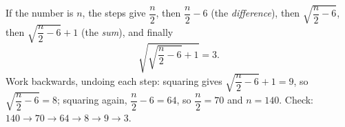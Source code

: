 If the number is $n$, the steps give $\dfrac {n}{2}$, then $\dfrac {n}{2}-6$ (the \emph{difference}), then $\sqrt{\dfrac {n}{2}-6}$, then $\sqrt{\dfrac {n}{2}-6}+1$ (the \emph{sum}), and finally
\[
\sqrt{\sqrt{\dfrac {n}{2}-6}+1}=3 .
\]
Work backwards, undoing each step: squaring gives $\sqrt{\dfrac {n}{2}-6}+1=9$, so $\sqrt{\dfrac {n}{2}-6}=8$; squaring again, $\dfrac {n}{2}-6=64$, so $\dfrac {n}{2}=70$ and $n=\boxed{140}$. Check: $140\to70\to64\to8\to9\to3$.

